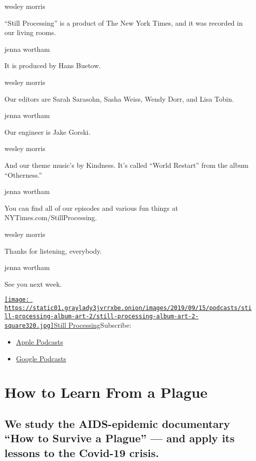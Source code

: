 wesley morris

``Still Processing'' is a product of The New York Times, and it was
recorded in our living rooms.

jenna wortham

It is produced by Hans Buetow.

wesley morris

Our editors are Sarah Sarasohn, Sasha Weiss, Wendy Dorr, and Lisa Tobin.

jenna wortham

Our engineer is Jake Gorski.

wesley morris

And our theme music's by Kindness. It's called ``World Restart'' from
the album ``Otherness.''

jenna wortham

You can find all of our episodes and various fun things at
NYTimes.com/StillProcessing.

wesley morris

Thanks for listening, everybody.

jenna wortham

See you next week.

\href{https://www.nytimes3xbfgragh.onion/column/still-processing-podcast}{\texttt{[image: https://static01.graylady3jvrrxbe.onion/images/2019/09/15/podcasts/still-processing-album-art-2/still-processing-album-art-2-square320.jpg]}Still
Processing}Subscribe:

\begin{itemize}
\tightlist
\item
  \href{https://itunes.apple.com/us/podcast/id1151436460}{Apple
  Podcasts}
\item
  \href{https://www.google.com/podcasts?feed=aHR0cHM6Ly9yc3MuYXJ0MTkuY29tL255dC1zdGlsbC1wcm9jZXNzaW5n}{Google
  Podcasts}
\end{itemize}

\hypertarget{how-to-learn-from-a-plague-1}{%
\section{How to Learn From a
Plague}\label{how-to-learn-from-a-plague-1}}

\hypertarget{we-study-the-aids-epidemic-documentary-how-to-survive-a-plague--and-apply-its-lessons-to-the-covid-19-crisis-1}{%
\subsection{We study the AIDS-epidemic documentary ``How to Survive a
Plague'' --- and apply its lessons to the Covid-19
crisis.}\label{we-study-the-aids-epidemic-documentary-how-to-survive-a-plague--and-apply-its-lessons-to-the-covid-19-crisis-1}}

